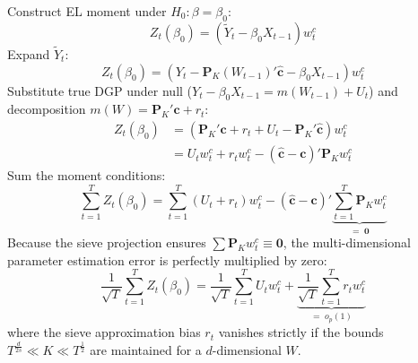 \documentclass[11pt,landscape]{article}
\begin{document}
\begin{minipage}[t]{0.48\textwidth}
Construct EL moment under $H_0: \beta = \beta_0$:
\begin{equation}
    Z_t(\beta_0) = \left( \widetilde{Y}_t - \beta_0 X_{t-1} \right) w^c_t
\end{equation}
Expand $\widetilde{Y}_t$:
\begin{equation}
    Z_t(\beta_0) = \left( Y_t - \bm{P}_K(W_{t-1})'\widehat{\bm{c}} - \beta_0 X_{t-1} \right) w^c_t
\end{equation}
Substitute true DGP under null ($Y_t - \beta_0 X_{t-1} = m(W_{t-1}) + U_t$) and decomposition $m(W) = \bm{P}_K'\bm{c} + r_t$:
\begin{align}
    Z_t(\beta_0) &= \left( \bm{P}_K'\bm{c} + r_t + U_t - \bm{P}_K'\widehat{\bm{c}} \right) w^c_t \\
    &= U_t w^c_t + r_t w^c_t - (\widehat{\bm{c}} - \bm{c})'\bm{P}_K w^c_t
\end{align}
Sum the moment conditions:
\begin{equation}
    \sum_{t=1}^T Z_t(\beta_0) = \sum_{t=1}^T \left( U_t + r_t \right) w^c_t - (\widehat{\bm{c}} - \bm{c})' \underbrace{\sum_{t=1}^T \bm{P}_K w^c_t}_{=\; \bm{0}}
\end{equation}
Because the sieve projection ensures $\sum \bm{P}_K w^c_t \equiv \bm{0}$, the multi-dimensional parameter estimation error is perfectly multiplied by zero:
\begin{equation}
    \frac{1}{\sqrt{T}}\sum_{t=1}^T Z_t(\beta_0) = \frac{1}{\sqrt{T}}\sum_{t=1}^T U_t w^c_t + \underbrace{\frac{1}{\sqrt{T}}\sum_{t=1}^T r_t w^c_t}_{=\; o_p(1)}
\end{equation}
where the sieve approximation bias $r_t$ vanishes strictly if the bounds $T^{\frac{d}{2s}} \ll K \ll T^{\frac{1}{2}}$ are maintained for a $d$-dimensional $W$.
\end{minipage}
\end{document}

